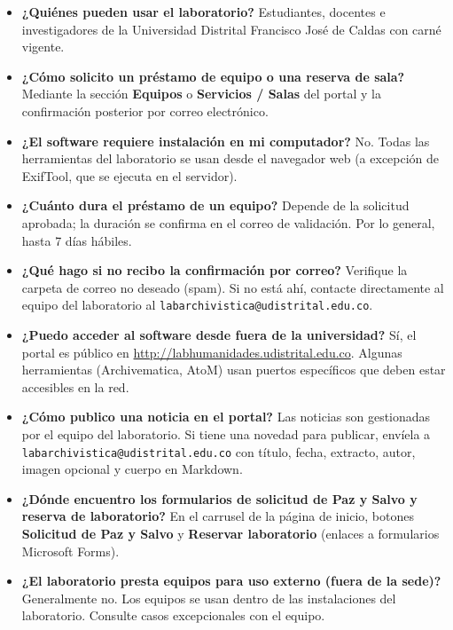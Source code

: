 \documentclass[12pt,a4paper]{report}
\begin{document}
\begin{itemize}
  \item \textbf{¿Quiénes pueden usar el laboratorio?}
    Estudiantes, docentes e investigadores de la Universidad Distrital
    Francisco José de Caldas con carné vigente.
  \item \textbf{¿Cómo solicito un préstamo de equipo o una reserva de sala?}
    Mediante la sección \textbf{Equipos} o \textbf{Servicios / Salas} del
    portal y la confirmación posterior por correo electrónico.
  \item \textbf{¿El software requiere instalación en mi computador?}
    No. Todas las herramientas del laboratorio se usan desde el navegador web
    (a excepción de ExifTool, que se ejecuta en el servidor).
  \item \textbf{¿Cuánto dura el préstamo de un equipo?}
    Depende de la solicitud aprobada; la duración se confirma en el correo de
    validación. Por lo general, hasta 7 días hábiles.
  \item \textbf{¿Qué hago si no recibo la confirmación por correo?}
    Verifique la carpeta de correo no deseado (spam). Si no está ahí,
    contacte directamente al equipo del laboratorio al
    \texttt{labarchivistica@udistrital.edu.co}.
  \item \textbf{¿Puedo acceder al software desde fuera de la universidad?}
    Sí, el portal es público en
    \url{http://labhumanidades.udistrital.edu.co}. Algunas herramientas
    (Archivematica, AtoM) usan puertos específicos que deben estar
    accesibles en la red.
  \item \textbf{¿Cómo publico una noticia en el portal?}
    Las noticias son gestionadas por el equipo del laboratorio. Si tiene una
    novedad para publicar, envíela a \texttt{labarchivistica@udistrital.edu.co}
    con título, fecha, extracto, autor, imagen opcional y cuerpo en Markdown.
  \item \textbf{¿Dónde encuentro los formularios de solicitud de Paz y Salvo
        y reserva de laboratorio?}
    En el carrusel de la página de inicio, botones \textbf{Solicitud de Paz
    y Salvo} y \textbf{Reservar laboratorio} (enlaces a formularios Microsoft
    Forms).
  \item \textbf{¿El laboratorio presta equipos para uso externo (fuera de la
        sede)?}
    Generalmente no. Los equipos se usan dentro de las instalaciones del
    laboratorio. Consulte casos excepcionales con el equipo.
\end{itemize}
\end{document}
